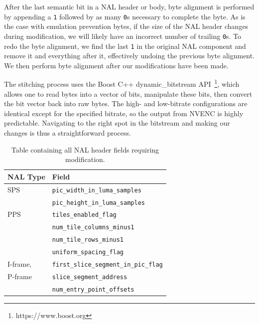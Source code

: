 After the last semantic bit in a NAL header or body, byte alignment is performed by appending a \texttt{1} followed by as many \texttt{0}s necessary to complete the byte. As is the case with emulation prevention bytes, if the size of the NAL header changes during modification, we will likely have an incorrect number of trailing \texttt{0}s. To redo the byte alignment, we find the last \texttt{1} in the original NAL component and remove it and everything after it, effectively undoing the previous byte alignment. We then perform byte alignment after our modifications have been made.

The stitching process uses the Boost C++ dynamic\_bitstream API~\footnote{https://www.boost.org}, which allows one to read bytes into a vector of bits, manipulate these bits, then convert the bit vector back into raw bytes. The high- and low-bitrate configurations are identical except for the specified bitrate, so the output from NVENC is highly predictable. Navigating to the right spot in the bitstream and making our changes is thus a straightforward process.

\setcounter{figure}{1}
\begin{table}
	\begin{tabularx}{\columnwidth}{ll}
		\toprule
		NAL Type & Field \\
		\midrule
		SPS & \texttt{pic\_width\_in\_luma\_samples} \\
		 & \texttt{pic\_height\_in\_luma\_samples}  \\
		\midrule
		PPS & \texttt{tiles\_enabled\_flag}  \\
		& \texttt{num\_tile\_columns\_minus1}  \\
		& \texttt{num\_tile\_rows\_minus1}  \\
		& \texttt{uniform\_spacing\_flag}  \\
		\midrule
		I-frame, & \texttt{first\_slice\_segment\_in\_pic\_flag} \\
		P-frame & \texttt{slice\_segment\_address}  \\
		& \texttt{num\_entry\_point\_offsets}  \\
		\bottomrule
	\end{tabularx}
	\caption{Table containing all NAL header fields requiring modification.}
\label{tab:stitch}
\end{table}
\renewcommand{\figurename}{Fig.}
\setcounter{figure}{1}

